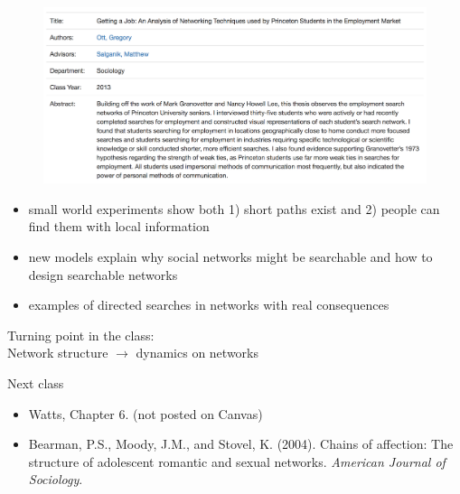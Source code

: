 \documentclass[aspectratio=169]{beamer}
\begin{document}
\begin{frame}

\begin{figure}
\center
\includegraphics[width = \textwidth]{figures/ott_getting_2013_title}
\end{figure}

\end{frame}
\begin{frame}

\begin{itemize}
\item small world experiments show both 1) short paths exist and 2) people can find them with local information
\pause
\item new models explain why social networks might be searchable and how to design searchable networks
\pause
\item examples of directed searches in networks with real consequences
\end{itemize}

\end{frame}
\begin{frame}

Turning point in the class:\\
Network structure $\rightarrow$ dynamics on networks

\end{frame}
\begin{frame}

Next class
\begin{itemize}
\item  Watts, Chapter 6. (not posted on Canvas)
\item Bearman, P.S., Moody, J.M., and Stovel, K. (2004). Chains of affection: The structure of adolescent romantic and sexual networks. \textit{American Journal of Sociology}.
\end{itemize}

\end{frame}
\end{document}

